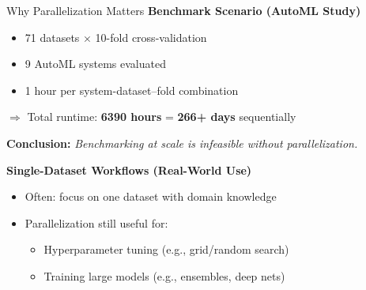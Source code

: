\documentclass[11pt,compress,t,notes=noshow, aspectratio=169, xcolor=table]{beamer}
\begin{document}
\begin{vbframe}{Why Parallelization Matters}
\vfill
\textbf{Benchmark Scenario (AutoML Study)}
\begin{itemize}
    \item 71 datasets $\times$ 10-fold cross-validation
    \item 9 AutoML systems evaluated
    \item 1 hour per system-dataset–fold combination
\end{itemize}
$\Rightarrow$ Total runtime: \textbf{6390 hours} = \textbf{266+ days} sequentially

\vspace{1em}
\textbf{Conclusion:} \textit{Benchmarking at scale is infeasible without parallelization.}

\vfill
\pause
\textbf{Single-Dataset Workflows (Real-World Use)}
\begin{itemize}
    \item Often: focus on one dataset with domain knowledge
    \item Parallelization still useful for:
    \begin{itemize}
        \item Hyperparameter tuning (e.g., grid/random search)
        \item Training large models (e.g., ensembles, deep nets)
    \end{itemize}
\end{itemize}
\vfill
\end{vbframe}



\endlecture
\end{document}
